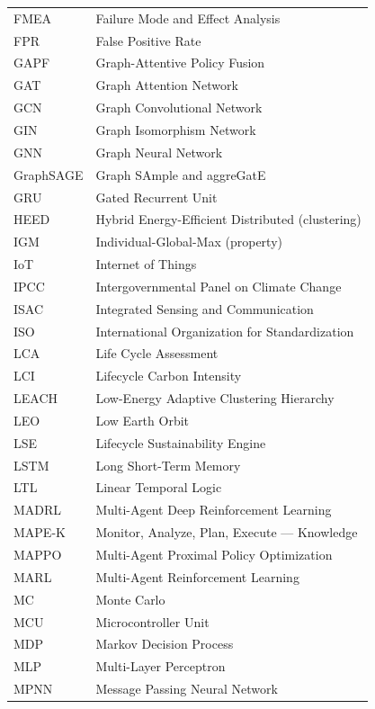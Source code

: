\begin{longtable}{lp{5in}}
FMEA       & Failure Mode and Effect Analysis\\
FPR        & False Positive Rate\\
GAPF       & Graph-Attentive Policy Fusion\\
GAT        & Graph Attention Network\\
GCN        & Graph Convolutional Network\\
GIN        & Graph Isomorphism Network\\
GNN        & Graph Neural Network\\
GraphSAGE  & Graph SAmple and aggreGatE\\
GRU        & Gated Recurrent Unit\\
HEED       & Hybrid Energy-Efficient Distributed (clustering)\\
IGM        & Individual-Global-Max (property)\\
IoT        & Internet of Things\\
IPCC       & Intergovernmental Panel on Climate Change\\
ISAC       & Integrated Sensing and Communication\\
ISO        & International Organization for Standardization\\
LCA        & Life Cycle Assessment\\
LCI        & Lifecycle Carbon Intensity\\
LEACH      & Low-Energy Adaptive Clustering Hierarchy\\
LEO        & Low Earth Orbit\\
LSE        & Lifecycle Sustainability Engine\\
LSTM       & Long Short-Term Memory\\
LTL        & Linear Temporal Logic\\
MADRL      & Multi-Agent Deep Reinforcement Learning\\
MAPE-K     & Monitor, Analyze, Plan, Execute --- Knowledge\\
MAPPO      & Multi-Agent Proximal Policy Optimization\\
MARL       & Multi-Agent Reinforcement Learning\\
MC         & Monte Carlo\\
MCU        & Microcontroller Unit\\
MDP        & Markov Decision Process\\
MLP        & Multi-Layer Perceptron\\
MPNN       & Message Passing Neural Network\\

\end{longtable}
